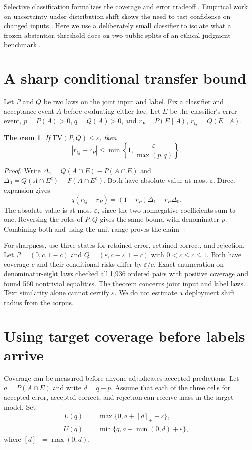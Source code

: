 \documentclass[11pt]{article}
\newtheorem{theorem}{Theorem}
\begin{document}
Selective classification formalizes the coverage and error
tradeoff \cite{geifman}. Empirical work on uncertainty under
distribution shift shows the need to test confidence on changed
inputs \cite{ovadia}. Here we use a deliberately small classifier
to isolate what a frozen abstention threshold does on two public
splits of an ethical judgment benchmark \cite{hendrycks}.

\section{A sharp conditional transfer bound}
Let $P$ and $Q$ be two laws on the joint input and label.
Fix a classifier and acceptance event $A$ before evaluating
either law. Let $E$ be the classifier's error event,
$p=P(A)>0$, $q=Q(A)>0$, and
$r_P=P(E\mid A)$, $r_Q=Q(E\mid A)$.

\begin{theorem}
If $\mathrm{TV}(P,Q)\le\varepsilon$, then
\[
 |r_Q-r_P|\le\min\!\left\{1,\frac{\varepsilon}{\max(p,q)}\right\}.
\]
\end{theorem}
\begin{proof}
Write $\Delta_1=Q(A\cap E)-P(A\cap E)$ and
$\Delta_0=Q(A\cap E^c)-P(A\cap E^c)$. Both have absolute
value at most $\varepsilon$. Direct expansion gives
\[
q(r_Q-r_P)=(1-r_P)\Delta_1-r_P\Delta_0 .
\]
The absolute value is at most $\varepsilon$, since the two
nonnegative coefficients sum to one. Reversing the roles of
$P,Q$ gives the same bound with denominator $p$. Combining
both and using the unit range proves the claim.
\end{proof}

For sharpness, use three states for retained error, retained
correct, and rejection. Let $P=(0,c,1-c)$ and
$Q=(\varepsilon,c-\varepsilon,1-c)$ with
$0<\varepsilon\le c\le1$. Both have coverage $c$ and their
conditional risks differ by $\varepsilon/c$. Exact enumeration
on denominator-eight laws checked all 1,936 ordered pairs with
positive coverage and found 560 nontrivial equalities.
The theorem concerns joint input and label laws. Text similarity
alone cannot certify $\varepsilon$. We do not estimate a
deployment shift radius from the corpus.

\section{Using target coverage before labels arrive}
Coverage can be measured before anyone adjudicates accepted
predictions. Let $a=P(A\cap E)$ and write $d=q-p$. Assume
that each of the three cells for accepted error, accepted correct,
and rejection can receive mass in the target model. Set
\begin{align*}
 L(q)&=\max\{0,a+[d]_+-\varepsilon\},\\
 U(q)&=\min\{q,a+\min(0,d)+\varepsilon\},
\end{align*}
where $[d]_+=\max(0,d)$.
\end{document}
